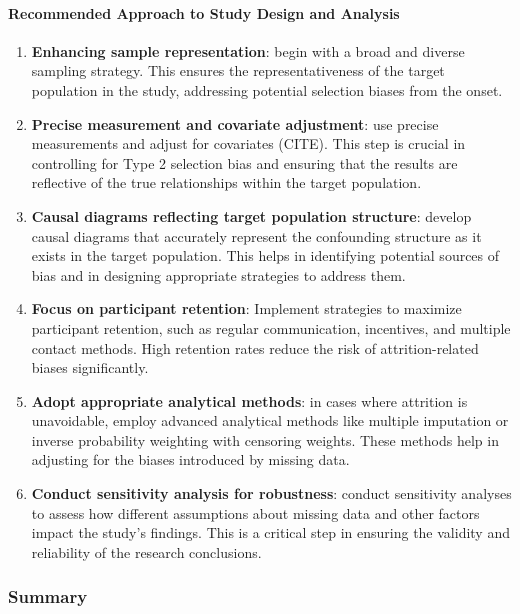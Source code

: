 \documentclass[
  singlecolumn,
  9pt]{article}
\let\oldparagraph\paragraph
\renewcommand{\paragraph}[1]{\oldparagraph{#1}\mbox{}}
\begin{document}
\paragraph{Recommended Approach to Study Design and
Analysis}\label{recommended-approach-to-study-design-and-analysis}

\begin{enumerate}
\def\labelenumi{\arabic{enumi}.}
\item
  \textbf{Enhancing sample representation}: begin with a broad and
  diverse sampling strategy. This ensures the representativeness of the
  target population in the study, addressing potential selection biases
  from the onset.
\item
  \textbf{Precise measurement and covariate adjustment}: use precise
  measurements and adjust for covariates (CITE). This step is crucial in
  controlling for Type 2 selection bias and ensuring that the results
  are reflective of the true relationships within the target population.
\item
  \textbf{Causal diagrams reflecting target population structure}:
  develop causal diagrams that accurately represent the confounding
  structure as it exists in the target population. This helps in
  identifying potential sources of bias and in designing appropriate
  strategies to address them.
\item
  \textbf{Focus on participant retention}: Implement strategies to
  maximize participant retention, such as regular communication,
  incentives, and multiple contact methods. High retention rates reduce
  the risk of attrition-related biases significantly.
\item
  \textbf{Adopt appropriate analytical methods}: in cases where
  attrition is unavoidable, employ advanced analytical methods like
  multiple imputation or inverse probability weighting with censoring
  weights. These methods help in adjusting for the biases introduced by
  missing data.
\item
  \textbf{Conduct sensitivity analysis for robustness}: conduct
  sensitivity analyses to assess how different assumptions about missing
  data and other factors impact the study's findings. This is a critical
  step in ensuring the validity and reliability of the research
  conclusions.
\end{enumerate}

\subsubsection{Summary}\label{summary}
\end{document}
